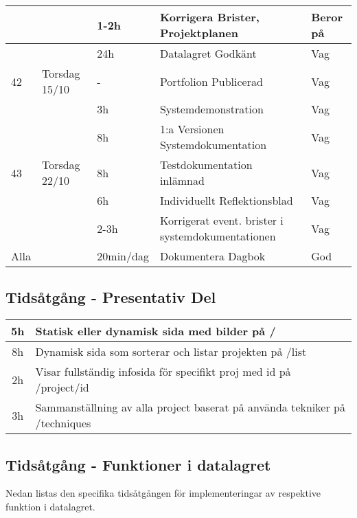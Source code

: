 \documentclass{TDP003mall}
\begin{document}
\begin{itemize}
\begin{tabularx}{\linewidth}{|l|l|l|X|l|}
	\hline
          &                & 1-2h           & Korrigera Brister, Projektplanen                    & Beror på    \\
	\hline
          &                & 24h            & Datalagret Godkänt                                  & Vag         \\
	\hline
	42    & Torsdag 15/10  & -              & Portfolion Publicerad                               & Vag         \\
	\hline
          &                & 3h             & Systemdemonstration                                 & Vag         \\
	\hline
          &                & 8h             & 1:a Versionen Systemdokumentation                   & Vag         \\
	\hline
	43    & Torsdag 22/10  & 8h             & Testdokumentation inlämnad                          & Vag         \\
	\hline
          &                & 6h             & Individuellt Reflektionsblad                        & Vag         \\
	\hline
          &                & 2-3h           & Korrigerat event. brister i systemdokumentationen   & Vag         \\
	\hline
	\hline
	Alla  &                & 20min/dag      & Dokumentera Dagbok                                  & God         \\
	\hline
\end{tabularx}{\linewidth}

\subsection{Tidsåtgång - Presentativ Del}
\begin{tabularx}{\linewidth}{|c|X|}
	\hline
	5h & Statisk eller dynamisk sida med bilder på /\\
	\hline
	8h & Dynamisk sida som sorterar och listar projekten på /list\\
	\hline
	2h & Visar fullständig infosida för specifikt proj med id på /project/id\\
	\hline
	3h & Sammanställning av alla project baserat på använda tekniker på /techniques\\
	\hline
\end{tabularx}{\linewidth}

\subsection{Tidsåtgång - Funktioner i datalagret}
Nedan listas den specifika tidsåtgången för implementeringar av respektive funktion i datalagret.


\end{itemize}
\end{document}
